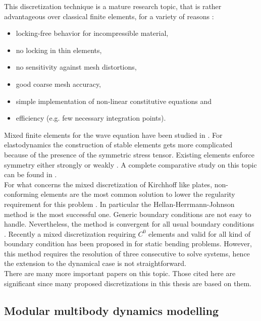 This discretization technique is a mature research topic, that is rather advantageous over classical finite elements, for a variety of reasons \cite{wriggers2009}:
\begin{itemize}
	\item locking-free behavior for incompressible material,
	\item no locking in thin elements,
	\item no sensitivity against mesh distortions,
	\item good coarse mesh accuracy, 
	\item simple implementation of non-linear constitutive equations and
	\item efficiency (e.g. few necessary integration points).
\end{itemize}

Mixed finite elements for the wave equation have been studied in \cite{geveci1988,becache2000wave}. For elastodynamics the construction of stable elements gets more complicated because of the presence of the symmetric stress tensor. Existing elements enforce symmetry either strongly \cite{becache2001elas,arnold2002mixed} or weakly \cite{arnold2007mixed,arnold2014elastodynamics}. A complete comparative study on this topic can be found in \cite{lee2012mixed}. \\

For what concerns the mixed discretization of Kirchhoff like plates, non-conforming elements are the most common solution to lower the regularity requirement for this problem \cite{arnold1990intro}. In particular the Hellan-Herrmann-Johnson method \cite{hellan1967,herrmann1967finite,johnson1973convergence} is the most successful one. Generic boundary conditions are not easy to handle. Nevertheless, the method is convergent for all usual boundary conditions \cite{blum1990}. Recently a mixed discretization requiring $C^0$ elements and valid for all kind of boundary condition has been proposed in \cite{rafetseder2018siam} for static bending problems. However, this method requires the resolution of three consecutive to solve systems, hence the extension to the dynamical case is not straightforward. \\

There are many more important papers on this topic. Those cited here are significant since many proposed discretizations in this thesis are based on them.

 
\subsection{Modular multibody dynamics modelling}

